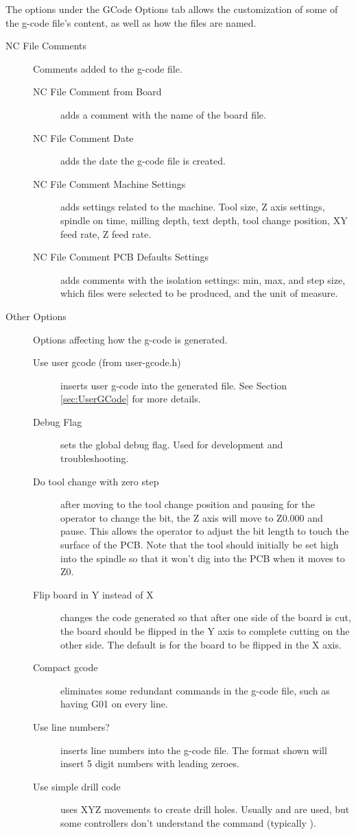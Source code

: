 \documentclass[11pt]{book}
\begin{document}
The options under the GCode Options tab allows the customization of some of the g-code file's content, as well as how the files are named.

\begin{description}
	\item[NC File Comments] Comments added to the g-code file.
	\begin{description}
		\item[NC File Comment from Board] adds a comment with the name of the board file.
		\item[NC File Comment Date] adds the date the g-code file is created.
		\item[NC File Comment Machine Settings] adds settings related to the machine. Tool size, Z axis settings, spindle on time, milling depth, text depth, tool change position, XY feed rate, Z feed rate.
		\item[NC File Comment PCB Defaults Settings] adds comments with the isolation settings: min, max, and step size, which files were selected to be produced, and the unit of measure.
	\end{description}
	
	\item[Other Options] Options affecting how the g-code is generated.
	\begin{description}
		\item[Use user gcode (from user-gcode.h)] inserts user g-code into the generated file. See Section \vref{sec:UserGCode} for more details.
		\item[Debug Flag] sets the global debug flag. Used for development and troubleshooting.
		\item[Do tool change with zero step] after moving to the tool change position and pausing for the operator to change the bit, the Z axis will move to Z0.000 and pause. This allows the operator to adjust the bit length to touch the surface of the PCB. Note that the tool should initially be set high into the spindle so that it won't dig into the PCB when it moves to Z0.
		\item[Flip board in Y instead of X] changes the code generated so that after one side of the board is cut, the board should be flipped in the Y axis to complete cutting on the other side. The default is for the board to be flipped in the X axis.
		\item[Compact gcode] eliminates some redundant commands in the g-code file, such as having G01 on every line.
		\item[Use line numbers?] inserts line numbers into the g-code file. The format shown  will insert 5 digit numbers with leading zeroes.
		\item[Use simple drill code] uses XYZ movements to create drill holes. Usually  and  are used, but some controllers don't understand the command (typically ).
	\end{description}
	

\end{description}
\end{document}
